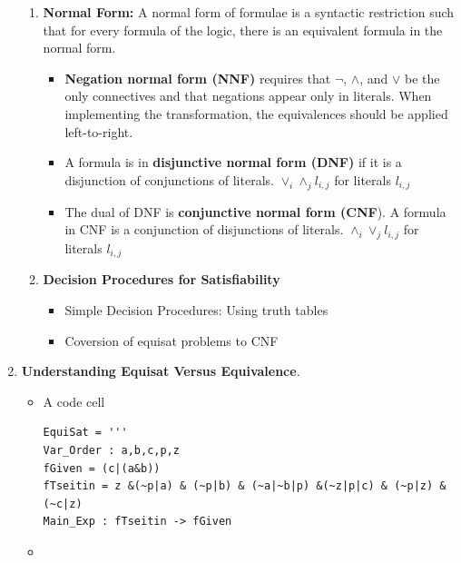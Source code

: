 \documentclass[10pt]{article}
\begin{document}
\begin{enumerate}
\begin{minipage}{\minpagw}
{{\begin{enumerate}
          \item \textbf{Normal Form:} A normal form of formulae is a syntactic restriction such that for every formula of the logic, there is an equivalent formula in the normal form.
          \begin{itemize}
              \item \textbf{Negation normal form (NNF)} requires that $\lnot$, $\wedge$, and $\vee$ be the only connectives and that negations appear only in literals. When implementing the transformation, the equivalences should be applied left-to-right.
              \item A formula is in \textbf{disjunctive normal form (DNF)} if it is a disjunction of conjunctions of literals. $\vee_i \wedge_j l_{i,j}$ for literals $l_{i,j}$   
              \item The dual of DNF is \textbf{conjunctive normal form (CNF}). A formula in CNF is a conjunction of disjunctions of literals. $\wedge_i \vee_j l_{i,j}$ for literals $l_{i,j}$ 
              \end{itemize}
      \item \textbf{ Decision Procedures for Satisfiability}
      \begin{itemize}
          \item Simple Decision Procedures: Using truth tables
          \item Coversion of equisat problems to CNF
      \end{itemize}
      \end{enumerate}
    }%
  }%
\end{minipage}

\clearpage


\item \textbf{Understanding Equisat Versus Equivalence}. \begin{itemize}
  \item A code cell

    \begin{Verbatim}[frame=single]
EquiSat = '''
Var_Order : a,b,c,p,z
fGiven = (c|(a&b))
fTseitin = z &(~p|a) & (~p|b) & (~a|~b|p) &(~z|p|c) & (~p|z) & (~c|z)
Main_Exp : fTseitin -> fGiven 
\end{Verbatim}


  
  

\item 


\end{itemize}
\end{enumerate}
\end{document}
